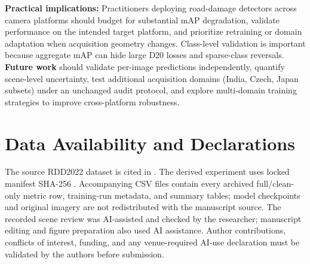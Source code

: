 \documentclass[conference,a4paper]{IEEEtran}
\begin{document}
\textbf{Practical implications:} Practitioners deploying road-damage detectors across camera platforms should budget for substantial mAP degradation, validate performance on the intended target platform, and prioritize retraining or domain adaptation when acquisition geometry changes. Class-level validation is important because aggregate mAP can hide large D20 losses and sparse-class reversals. \textbf{Future work} should validate per-image predictions independently, quantify scene-level uncertainty, test additional acquisition domains (India, Czech, Japan subsets) under an unchanged audit protocol, and explore multi-domain training strategies to improve cross-platform robustness.

\section*{Data Availability and Declarations}
The source RDD2022 dataset is cited in \cite{arya2024rdd2022}. The derived experiment uses locked manifest SHA-256 \texttt{}. Accompanying CSV files contain every archived full/clean-only metric row, training-run metadata, and summary tables; model checkpoints and original imagery are not redistributed with the manuscript source. The recorded scene review was AI-assisted and checked by the researcher; manuscript editing and figure preparation also used AI assistance. Author contributions, conflicts of interest, funding, and any venue-required AI-use declaration must be validated by the authors before submission.

\balance


\end{document}
